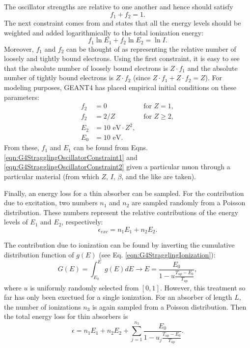 The oscillator strengths are relative to one another and hence should satisfy
\begin{equation}\label{eqn:G4StragglingOscillatorConstraint1}
f_1+f_2=1.
\end{equation}
The next constraint comes from \cite{bichsel1988} and states that all the energy levels should be weighted and added logarithmically to the total ionization energy:
\begin{equation}\label{eqn:G4StragglingOscillatorConstraint2}
f_1 \ln E_1 + f_2 \ln E_2 = \ln I.
\end{equation}
Moreover, $f_1$ and $f_2$ can be thought of as representing the relative number of loosely and tightly bound electrons. Using the first constraint, it is easy to see that the absolute number of loosely bound electrons is $Z\cdot f_1$ and the absolute number of tightly bound electrons is $Z\cdot f_2$ (since $Z\cdot f_1+Z\cdot f_2=Z$). For modeling purposes, GEANT4 has placed empirical initial conditions on these parameters:
\begin{align} \label{eqn:G4StragglingOscillatorConstraint3}
f_2 & = 0 & \text{   for   } Z=1,\\
f_2 & = 2/Z & \text{     for     } Z\ge 2,\\
E_2 & = 10 \text{ eV}\cdot Z^2,\\
E_0 &= 10 \text{ eV}.
\end{align}
From these, $f_1$ and $E_1$ can be found from Eqns. \ref{eqn:G4StragglingOscillatorConstraint1} and \ref{eqn:G4StragglingOscillatorConstraint2} given a particular muon through a particular material (from which $Z$, $I$, $\beta$, and the like are taken).

Finally, an energy loss for a thin absorber can be sampled. For the contribution due to excitation, two numbers $n_1$ and $n_2$ are sampled randomly from a Poisson distribution. These numbers represent the relative contributions of the energy levels of $E_1$ and $E_2$, respectively:
\begin{equation}\nonumber
\epsilon_{exc}=n_1 E_1 + n_2 E_2.
\end{equation}

The contribution due to ionization can be found by inverting the cumulative distribution function of $g(E)$ (see Eq. \eqref{eqn:G4StragglingIonization}):
\begin{equation}\nonumber
G(E)=\int_{E_0}^E g(E) dE \rightarrow E=\frac{E_0}{1-u\frac{T_{up}-E_0}{T_{up}}},
\end{equation}
where $u$ is uniformly randomly selected from $[0,1]$. However, this treatment so far has only been exectued for a single ionization. For an absorber of length $L$, the number of ionizations $n_3$ is again sampled from a Poisson distribution. Then the total energy loss for thin absorbers is
\begin{equation}\label{G4StragglingThin}
\epsilon = n_1 E_1 + n_2 E_2 + \sum_{j=1}^{n_3} \frac{E_0}{1-u_j \frac{T_{up}-E_0}{T_{up}}}.
\end{equation}

